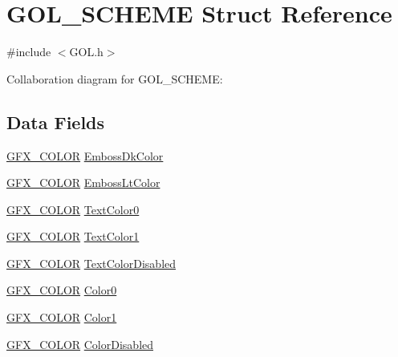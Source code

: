 \hypertarget{struct_g_o_l___s_c_h_e_m_e}{}\section{G\+O\+L\+\_\+\+S\+C\+H\+E\+M\+E Struct Reference}
\label{struct_g_o_l___s_c_h_e_m_e}


{\ttfamily \#include $<$G\+O\+L.\+h$>$}



Collaboration diagram for G\+O\+L\+\_\+\+S\+C\+H\+E\+M\+E\+:
\subsection*{Data Fields}
\begin{DoxyCompactItemize}
\item 
\hyperlink{gfxcolors_8h_a0658edb6e7bd88d6e9a185711893441c}{G\+F\+X\+\_\+\+C\+O\+L\+O\+R} \hyperlink{struct_g_o_l___s_c_h_e_m_e_a29593251b50d2261cf51ec741603b72b}{Emboss\+Dk\+Color}
\item 
\hyperlink{gfxcolors_8h_a0658edb6e7bd88d6e9a185711893441c}{G\+F\+X\+\_\+\+C\+O\+L\+O\+R} \hyperlink{struct_g_o_l___s_c_h_e_m_e_a4da6b54962d8e14af19f0441db176a6d}{Emboss\+Lt\+Color}
\item 
\hyperlink{gfxcolors_8h_a0658edb6e7bd88d6e9a185711893441c}{G\+F\+X\+\_\+\+C\+O\+L\+O\+R} \hyperlink{struct_g_o_l___s_c_h_e_m_e_acde1a2115c6c5d7cc68407b25079f6fa}{Text\+Color0}
\item 
\hyperlink{gfxcolors_8h_a0658edb6e7bd88d6e9a185711893441c}{G\+F\+X\+\_\+\+C\+O\+L\+O\+R} \hyperlink{struct_g_o_l___s_c_h_e_m_e_ae5c9f2f71dbabd17bf23d5a34b9b27af}{Text\+Color1}
\item 
\hyperlink{gfxcolors_8h_a0658edb6e7bd88d6e9a185711893441c}{G\+F\+X\+\_\+\+C\+O\+L\+O\+R} \hyperlink{struct_g_o_l___s_c_h_e_m_e_a9f472bff4931c01efcd847238096e751}{Text\+Color\+Disabled}
\item 
\hyperlink{gfxcolors_8h_a0658edb6e7bd88d6e9a185711893441c}{G\+F\+X\+\_\+\+C\+O\+L\+O\+R} \hyperlink{struct_g_o_l___s_c_h_e_m_e_aa4bb98879942a5f1184f69062fa7450c}{Color0}
\item 
\hyperlink{gfxcolors_8h_a0658edb6e7bd88d6e9a185711893441c}{G\+F\+X\+\_\+\+C\+O\+L\+O\+R} \hyperlink{struct_g_o_l___s_c_h_e_m_e_a52635a312548c161fb00b9d9864d906d}{Color1}
\item 
\hyperlink{gfxcolors_8h_a0658edb6e7bd88d6e9a185711893441c}{G\+F\+X\+\_\+\+C\+O\+L\+O\+R} \hyperlink{struct_g_o_l___s_c_h_e_m_e_ad0dc2bf722ec4f105aaa6eb365991b0a}{Color\+Disabled}

\end{DoxyCompactItemize}
